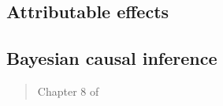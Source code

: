 \documentclass[12pt]{article}
\begin{document}
\begin{verse}  \end{verse}

\subsection{Attributable effects}

\begin{verse}  \end{verse}

\begin{verse}  \end{verse}

\begin{verse}  \end{verse}

\subsection{Bayesian causal inference}

\begin{verse}  \end{verse}

\begin{verse} Chapter 8 of  \end{verse}

\begin{verse}  \end{verse}

\begin{verse}  \end{verse}

\clearpage

\end{document}
